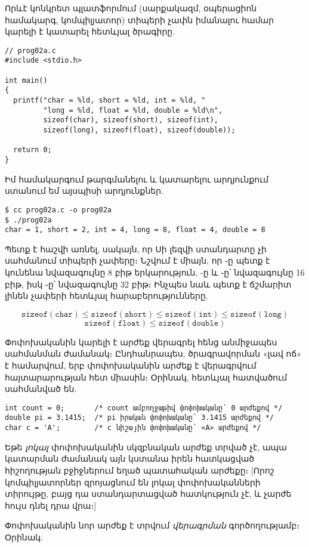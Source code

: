 Որևէ կոնկրետ պլատֆորմում (սարքակազմ, օպերացիոն համակարգ, կոմպիլյատոր)
տիպերի չափն իմանալու համար կարելի է կատարել հետևյալ ծրագիրը.

\begin{Verbatim}
// prog02a.c
#include <stdio.h>

int main()
{
  printf("char = %ld, short = %ld, int = %ld, "
         "long = %ld, float = %ld, double = %ld\n",
         sizeof(char), sizeof(short), sizeof(int),
         sizeof(long), sizeof(float), sizeof(double));

  return 0;
}
\end{Verbatim}

Իմ համակարգում թարգմանելու և կատարելու արդյունքում ստանում եմ
այսպիսի արդյունքներ.

\begin{Verbatim}
$ cc prog02a.c -o prog02a
$ ./prog02a
char = 1, short = 2, int = 4, long = 8, float = 4, double = 8
\end{Verbatim}

Պետք է հաշվի առնել, սակայն, որ Սի լեզվի ստանդարտը չի սահմանում
տիպերի չափերը։ Նշվում է միայն, որ ֊ը պետք է կունենա
նվազագույնը 8 բիթ երկարություն, -ը և ֊ը՝
նվազագույնը 16 բիթ, իսկ ֊ը՝ նվազագույնը 32 բիթ։
Ինչպես նաև պետք է ճշմարիտ լինեն չափերի հետևյալ հարաբերությունները.

\[
\mathtt{sizeof(char)} \le
\mathtt{sizeof(short)} \le
\mathtt{sizeof(int)} \le
\mathtt{sizeof(long)}
\]
\[
\mathtt{sizeof(float)} \le
\mathtt{sizeof(double)}
\]

Փոփոխականին կարելի է արժեք վերագրել հենց անմիջապես սահմանման
ժամանակ։ Ընդհանրապես, ծրագրավորման «լավ ոճ» է համարվում, երբ
փոփոխականին արժեք է վերագրվում հայտարարության հետ միասին։ Օրինակ,
հետևյալ հատվածում սահմանված են.

\begin{Verbatim}
int count = 0;       /* count ամբողջաթիվ փոփոխականը՝ 0 արժեքով */
double pi = 3.1415;  /* pi իրական փոփոխականը՝ 3.1415 արժեքով */
char c = 'A';        /* c նիշային փոփոխականը՝ «A» արժեքով */
\end{Verbatim}

Եթե \emph{լոկալ} փոփոխականին սկզբնական արժեք
տրված չէ, ապա կատարման ժամանակ այն կստանա իրեն հատկացված հիշողության
բջիջներում եղած պատահական արժեքը։ [Որոշ կոմպիլյատորներ զրոյացնում են
լոկալ փոփոխականների տիրույթը, բայց դա ստանդարտացված հատկություն չէ,
և չարժե հույս դնել դրա վրա։]

Փոփոխականին նոր արժեք է տրվում \code{=} \emph{վերագրման}
 գործողությամբ։ Օրինակ.


